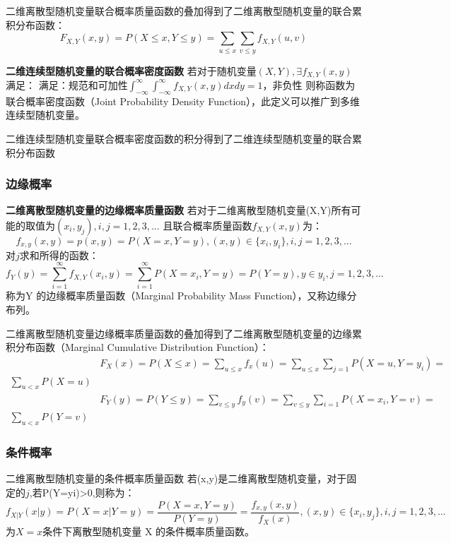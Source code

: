 \documentclass[12pt]{ctexart}
\begin{document}
二维离散型随机变量联合概率质量函数的叠加得到了二维离散型随机变量的联合累积分布函数：
\begin{equation}
    F_{X,Y}(x,y) = P(X\leq x,Y\leq y)=\sum_{u\leq x}\sum_{v\leq y}f_{X,Y}(u,v)
\end{equation}

\textcolor{myblue}{\textbf{二维连续型随机变量的联合概率密度函数}}
若对于随机变量$(X,Y), \exists f_{X,Y}(x,y)$满足：
满足：规范和可加性$\int_{-\infty}^{\infty}\int_{-\infty}^{\infty}f_{X,Y}(x,y)dxdy = 1$，非负性
则称函数为联合概率密度函数（Joint Probability Density Function），此定义可以推广到多维连续型随机变量。

二维连续型随机变量联合概率密度函数的积分得到了二维连续型随机变量的联合累积分布函数


\subsubsection{边缘概率}
\textcolor{myblue}{\textbf{二维离散型随机变量的边缘概率质量函数}}
若对于二维离散型随机变量(X,Y)所有可能的取值为$(x_i,y_j),i,j=1,2,3,\dots$
且联合概率质量函数$f_{X,Y}(x,y)$为：
\begin{equation}
    f_{x,y}(x,y)=p(x,y)=P(X=x,Y=y), (x,y)\in \{x_i,y_i\},i,j=1,2,3,\dots
\end{equation}
对$j$求和所得的函数：
\begin{equation}
    f_Y(y)=\sum_{i=1}^{\infty}f_{X,Y}(x_i,y)=\sum_{i=1}^{\infty}P(X=x_i,Y=y)=P(Y=y),y\in{y_i},j=1,2,3,\dots
\end{equation}
称为Y 的边缘概率质量函数（Marginal Probability Mass Function），又称边缘分布列。

二维离散型随机变量边缘概率质量函数的叠加得到了二维离散型随机变量的边缘累积分布函数（Marginal Cumulative Distribution Function）：
\begin{equation}
    \begin{array}{rl}
        & F_X(x)=P(X\leq x)=\sum_{u\leq x}f_x(u)=\sum_{u\leq x}\sum_{j=1}P(X=u,Y=y_i)=  \\
        \sum_{u<x}P(X=u) \\
        & F_Y(y)=P(Y\leq y)=\sum_{v\leq y}f_y(v)=\sum_{v\leq y}\sum_{i=1}P(X=x_i,Y=v)= \\
        \sum_{u<x}P(Y=v)
    \end{array}
\end{equation}

\subsubsection{条件概率}
\textcolor{myblue}{二维离散型随机变量的条件概率质量函数}
若(x,y)是二维离散型随机变量，对于固定的$j$,若P(Y=y\textunderscore i)>0,则称为：
\begin{equation}
    f_{X|Y}(x|y)=P(X=x|Y=y)=\frac{P(X=x,Y=y)}{P(Y=y)}=\frac{f_{x,y}(x,y)}{f_X(x)},(x,y)\in\{x_i,y_j\},i,j=1,2,3,\dots
\end{equation}
为$X=x$条件下离散型随机变量 X 的条件概率质量函数。
\end{document}
